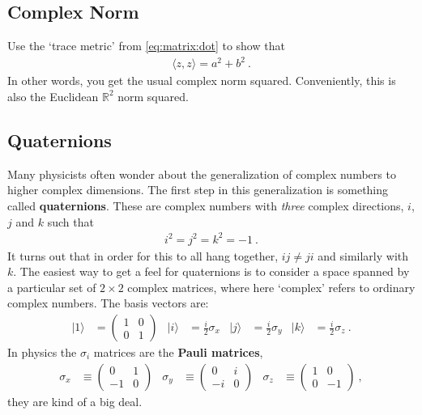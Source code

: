 \documentclass[12pt]{article}
\numberwithin{equation}{section}    %
\begin{document}
\subsection{Complex Norm}
Use the `trace metric' from \eqref{eq:matrix:dot} to show that 
\begin{align}
	\langle z,z\rangle = a^2 + b^2 \ .
\end{align}
In other words, you get the usual complex norm squared. Conveniently, this is also the Euclidean $\mathbb{R}^2$ norm squared. 

\subsection{Quaternions}

Many physicists often wonder about the generalization of complex numbers to higher complex dimensions. The first step in this generalization is something called \textbf{quaternions}. These are complex numbers with \emph{three} complex directions, $i$, $j$ and $k$ such that
\begin{align}
	i^2 = j^2 = k^2 = -1 \ .
	\label{eq:ijk:m1}
\end{align}
It turns out that in order for this to all hang together, $ij \neq ji$ and similarly with $k$. The easiest way to get a feel for quaternions is to consider a space spanned by a particular set of $2\times 2$ complex matrices, where here `complex' refers to ordinary complex numbers. The basis vectors are:
\begin{align}
	|1\rangle &=
	\begin{pmatrix}
		1 & 0 \\ 0 & 1
	\end{pmatrix}
	&
	|i\rangle &=
	\frac{i}{2}\sigma_x
	&
	|j\rangle &=
	\frac{i}{2}\sigma_y
	&
	|k\rangle &=
	\frac{i}{2}\sigma_z
	\ .
\end{align}
In physics the $\sigma_i$ matrices are the \textbf{Pauli matrices},
\begin{align}
\sigma_x&\equiv
	\begin{pmatrix}
		0 & 1 \\ -1 & 0
	\end{pmatrix}
	&
	\sigma_y
	&\equiv
	\begin{pmatrix}
		0 & i \\ -i & 0
	\end{pmatrix}
	&
	\sigma_z
	&\equiv
	\begin{pmatrix}
		1 & 0 \\ 0 & -1
	\end{pmatrix} \ ,
	\label{eq:Pauli}
\end{align}
they are kind of a big deal.
\end{document}
